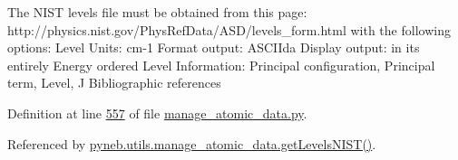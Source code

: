 \begin{DoxyVerb}The NIST levels file must be obtained from this page:
    http://physics.nist.gov/PhysRefData/ASD/levels_form.html
with the following options:
    Level Units: cm-1
    Format output: ASCIIda
    Display output: in its entirely
    Energy ordered
    Level Information: Principal configuration, Principal term, Level, J
    Bibliographic references
\end{DoxyVerb}
 

Definition at line \hyperlink{manage__atomic__data_8py_source_l00557}{557} of file \hyperlink{manage__atomic__data_8py_source}{manage\-\_\-atomic\-\_\-data.\-py}.



Referenced by \hyperlink{manage__atomic__data_8py_source_l00606}{pyneb.\-utils.\-manage\-\_\-atomic\-\_\-data.\-get\-Levels\-N\-I\-S\-T()}.


